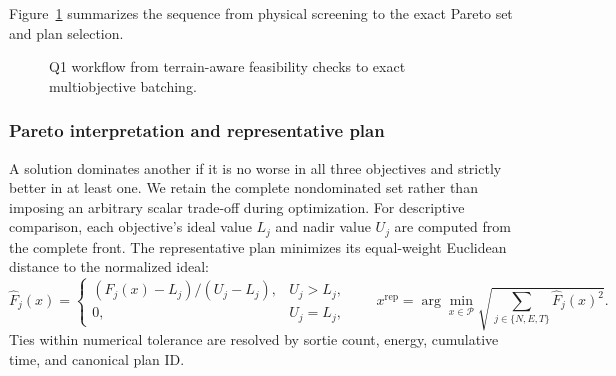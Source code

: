 \documentclass[11pt,a4paper]{article}
\begin{document}
Figure~\ref{fig:q1-workflow} summarizes the sequence from physical screening to the exact Pareto set and plan selection.

\begin{figure}[H]
\centering
{}
\caption{Q1 workflow from terrain-aware feasibility checks to exact multiobjective batching.}
\label{fig:q1-workflow}
\end{figure}

\subsubsection{Pareto interpretation and representative plan}
A solution dominates another if it is no worse in all three objectives and strictly better in at least one. We retain the complete nondominated set rather than imposing an arbitrary scalar trade-off during optimization. For descriptive comparison, each objective's ideal value $L_j$ and nadir value $U_j$ are computed from the complete front. The representative plan minimizes its equal-weight Euclidean distance to the normalized ideal:
\begin{equation}
\widehat F_j(x)=\begin{cases}(F_j(x)-L_j)/(U_j-L_j),&U_j>L_j,\\0,&U_j=L_j,\end{cases}\qquad
x^{\mathrm{rep}}=\arg\min_{x\in\mathcal P}\sqrt{\sum_{j\in\{N,E,T\}}\widehat F_j(x)^2}.
\label{eq:representative}
\end{equation}
Ties within numerical tolerance are resolved by sortie count, energy, cumulative time, and canonical plan ID.
\end{document}
